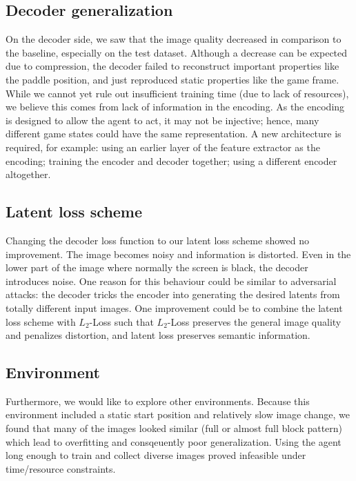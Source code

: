 \subsection{Decoder generalization}
On the decoder side, we saw that the image quality decreased in
comparison to the baseline, especially on the test dataset. Although a decrease can
be expected due to compression, the decoder failed to reconstruct important
properties like the paddle position, and just reproduced static properties like
the game frame. While we cannot yet rule out insufficient training time (due to
lack of resources), we believe this comes from lack of information in the
encoding. As the encoding is designed to allow the agent to act, it may not be
injective; hence, many different game states could have the same representation. A
new architecture is required, for example: using an earlier layer of the feature
extractor as the encoding; training the encoder and decoder together; using a different encoder
altogether.

\subsection{Latent loss scheme}
Changing the decoder loss function to our latent loss scheme showed no
improvement. The image becomes noisy and information is distorted. Even
in the lower part of the image where normally the screen is black, the decoder introduces noise. One reason for this behaviour
could be similar to adversarial attacks: the decoder tricks
the encoder into generating the desired latents from totally different input images. One improvement could be to combine the latent loss scheme with $L_2$-Loss
such that $L_2$-Loss preserves the general image quality and penalizes distortion,
and latent loss preserves semantic information.

\subsection{Environment}
Furthermore, we would like to explore other environments. Because this
environment included a static start position and relatively slow image change,
we found that many of the images looked similar (full or almost full block
pattern) which lead to overfitting and consqeuently
poor generalization. Using the agent long enough to train and collect diverse
images proved infeasible under time/resource constraints.

